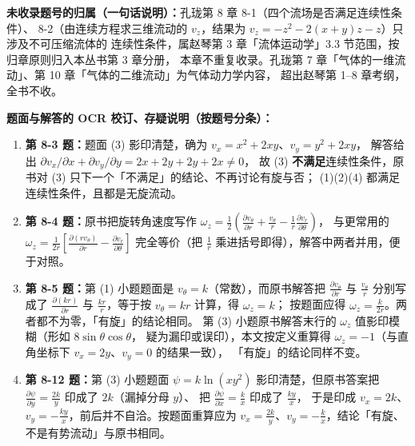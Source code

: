 \begin{tishi}
\textbf{未收录题号的归属（一句话说明）：}孔珑第 8 章 8-1（四个流场是否满足连续性条件）、
8-2（由连续方程求三维流动的 $v_z$，结果为 $v_z=-z^2-2(x+y)z-z$）只涉及不可压缩流体的
连续性条件，属赵琴第 3 章「流体运动学」3.3 节范围，按归章原则归入本丛书第 3 章分册，
本章不重复收录。孔珑第 7 章「气体的一维流动」、第 10 章「气体的二维流动」为气体动力学内容，
超出赵琴第 1--8 章考纲，全书不收。
\end{tishi}

\begin{tishi}
\textbf{题面与解答的 OCR 校订、存疑说明（按题号分条）：}
\begin{enumerate}[label=\arabic*.,leftmargin=1.8em,itemsep=2pt]
  \item \textbf{第 8-3 题：}题面 (3) 影印清楚，确为 $v_x=x^2+2xy$、$v_y=y^2+2xy$，
        解答给出 $\partial v_x/\partial x+\partial v_y/\partial y=2x+2y+2y+2x\neq0$，
        故 (3) \textbf{不满足}连续性条件，原书对 (3) 只下一个「不满足」的结论、不再讨论有旋与否；
        (1)(2)(4) 都满足连续性条件，且都是无旋流动。
  \item \textbf{第 8-4 题：}原书把旋转角速度写作
        $\omega_z=\frac{1}{2}\left(\frac{\partial v_\theta}{\partial r}+\frac{v_\theta}{r}-\frac{1}{r}\frac{\partial v_r}{\partial\theta}\right)$，
        与更常用的 $\omega_z=\frac{1}{2r}\left[\frac{\partial(rv_\theta)}{\partial r}-\frac{\partial v_r}{\partial\theta}\right]$
        完全等价（把 $\frac{1}{r}$ 乘进括号即得），解答中两者并用，便于对照。
  \item \textbf{第 8-5 题：}第 (1) 小题题面是 $v_\theta=k$（常数），而原书解答把
        $\frac{\partial v_\theta}{\partial r}$ 与 $\frac{v_\theta}{r}$ 分别写成了
        $\frac{\partial(kr)}{\partial r}$ 与 $\frac{kr}{r}$，等于按 $v_\theta=kr$ 计算，得 $\omega_z=k$；
        按题面应得 $\omega_z=\frac{k}{2r}$。两者都不为零，「有旋」的结论相同。
        第 (3) 小题原书解答末行的 $\omega_z$ 值影印模糊（形如 $8\sin\theta\cos\theta$，
        疑为漏印或误印），本文按定义重算得 $\omega_z=-1$（与直角坐标下 $v_x=2y$、$v_y=0$ 的结果一致），
        「有旋」的结论同样不变。
  \item \textbf{第 8-12 题：}第 (3) 小题题面 $\psi=k\ln(xy^2)$ 影印清楚，但原书答案把
        $\frac{\partial\psi}{\partial y}=\frac{2k}{y}$ 印成了 $2k$（漏掉分母 $y$）、
        把 $\frac{\partial\psi}{\partial x}=\frac{k}{x}$ 印成了 $\frac{ky}{x}$，
        于是印成 $v_x=2k$、$v_y=-\frac{ky}{x}$，前后并不自洽。按题面重算应为
        $v_x=\frac{2k}{y}$、$v_y=-\frac{k}{x}$，结论「有旋、不是有势流动」与原书相同。

\end{enumerate}
\end{tishi}
